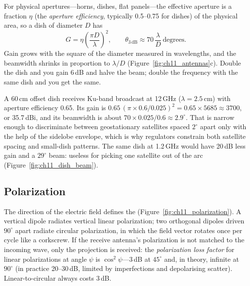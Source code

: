 For physical apertures---horns, dishes, flat panels---the effective aperture is a fraction $\eta$
(the \emph{aperture efficiency}, typically 0.5--0.75 for dishes) of the physical area, so a dish of
diameter $D$ has
\begin{equation}
G=\eta\left(\frac{\pi D}{\lambda}\right)^2,\qquad
\theta_{3\,\mathrm{dB}}\approx 70\,\frac{\lambda}{D}\ \text{degrees}.
\label{eq:ch11:dish}
\end{equation}
Gain grows with the square of the diameter measured in wavelengths, and the beamwidth shrinks in
proportion to $\lambda/D$ (Figure~\ref{fig:ch11_antennas}c). Double the dish and you gain 6\,dB
and halve the beam; double the frequency with the same dish and you get the same.


\begin{worked}
A 60\,cm offset dish receives Ku-band broadcast at 12\,GHz ($\lambda=2.5$\,cm) with aperture
efficiency 0.65. Its gain is $0.65\,(\pi\times0.6/0.025)^2=0.65\times5685\approx3700$, or
35.7\,dBi, and its beamwidth is about $70\times0.025/0.6\approx2.9^\circ$. That is narrow enough
to discriminate between geostationary satellites spaced $2^\circ$ apart only with the help of
the sidelobe envelope, which is why regulators constrain both satellite spacing and small-dish
patterns. The same dish at 1.2\,GHz would have 20\,dB less gain and a $29^\circ$ beam: useless
for picking one satellite out of the arc (Figure~\ref{fig:ch11_dish_beam}).
\end{worked}




\subsection{Polarization}

The direction of the electric field defines the 
(Figure~\ref{fig:ch11_polarization}). A vertical dipole radiates vertical linear polarization; two
orthogonal dipoles driven $90^\circ$ apart radiate circular polarization, in which the field vector
rotates once per cycle like a corkscrew. If the receive antenna's polarization is not matched to the
incoming wave, only the projection is received: the \emph{polarization loss factor} for linear
polarizations at angle $\psi$ is $\cos^2\psi$---3\,dB at $45^\circ$ and, in theory, infinite at
$90^\circ$ (in practice 20--30\,dB, limited by imperfections and depolarising scatter).
Linear-to-circular always costs 3\,dB.

